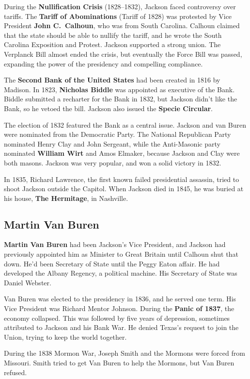 During the \textbf{Nullification Crisis} (1828--1832), Jackson faced controversy over tariffs.
The \textbf{Tariff of Abominations} (Tariff of 1828) was protested by Vice President \textbf{John C.\ Calhoun},
who was from South Carolina.
Calhoun claimed that the state should be able to nullify the tariff,
and he wrote the South Carolina Exposition and Protest.
Jackson supported a strong union.
The Verplanck Bill almost ended the crisis,
but eventually the Force Bill was passed, expanding the power of the presidency and compelling compliance.

The \textbf{Second Bank of the United States} had been created in 1816 by Madison.
In 1823, \textbf{Nicholas Biddle} was appointed as executive of the Bank.
Biddle submitted a recharter for the Bank in 1832, but Jackson didn't like the Bank, so he vetoed the bill.
Jackson also issued the \textbf{Specie Circular}.

The election of 1832 featured the Bank as a central issue.
Jackson and van Buren were nominated from the Democratic Party.
The National Republican Party nominated Henry Clay and John Sergeant,
while the Anti-Masonic party nominated \textbf{William Wirt} and Amos Elmaker,
because Jackson and Clay were both masons.
Jackson was very popular, and won a solid victory in 1832.

In 1835, Richard Lawrence, the first known failed presidential assassin,
tried to shoot Jackson outside the Capitol.
When Jackson died in 1845, he was buried at his house, \textbf{The Hermitage}, in Nashville.

\subsection*{Martin Van Buren}
\textbf{Martin Van Buren} had been Jackson's Vice President,
and Jackson had previously appointed him as Minister to Great Britain until Calhoun shut that down.
He'd been Secretary of State until the Peggy Eaton affair.
He had developed the Albany Regency, a political machine.
His Secretary of State was Daniel Webster.

Van Buren was elected to the presidency in 1836, and he served one term.
His Vice President was Richard Mentor Johnson.
During the \textbf{Panic of 1837}, the economy collapsed.
This was followed by five years of depression, sometimes attributed to Jackson and his Bank War.
He denied Texas's request to join the Union, trying to keep the world together.

During the 1838 Mormon War, Joseph Smith and the Mormons were forced from Missouri.
Smith tried to get Van Buren to help the Mormons, but Van Buren refused.

